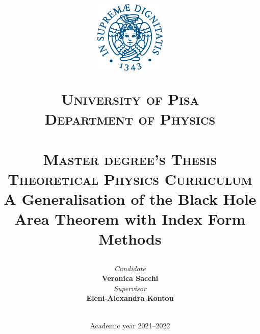 \title{
  \begin{figure}[h]
    \centering
    \includegraphics[width=0.3\textwidth]{Immagini/LogoUniPi/cherubino_pant541.eps}
  \end{figure}
  \vspace{11pt}
  \textsc{University of Pisa}\\
  {\small\textsc{Department of Physics}}\\
  \hrulefill \\
  \textsc{Master degree's Thesis}\\
  {\small\textsc{Theoretical Physics Curriculum}}\\
  \vspace{27pt}
  \LARGE \textbf{A Generalisation of the Black Hole Area Theorem with Index Form Methods} \\
  \vspace{27pt}
}

\author{
  \begin{minipage}[h]{0.45\linewidth}
    \begin{flushleft}
      \textit{Candidate} \\
      \textbf{Veronica Sacchi}
    \end{flushleft}
  \end{minipage}
  \begin{minipage}[h]{0.45\linewidth}
    \begin{flushright}
      \textit{Supervisor} \\
      \textbf{Eleni-Alexandra Kontou}
    \end{flushright}
  \end{minipage}
  \vspace{17pt}
}
\date{
  \hrulefill \\
  Academic year 2021--2022
}
  
